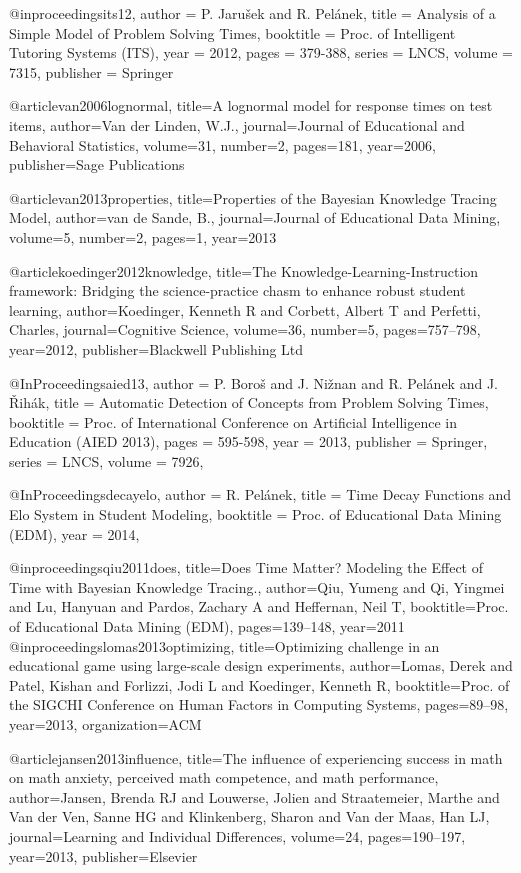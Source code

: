 @inproceedings{its12,
  author    = {P. Jaru\v{s}ek and R. Pel\'anek},
  title     = {Analysis of a Simple Model of Problem Solving Times},
  booktitle = {Proc. of Intelligent Tutoring Systems (ITS)},
  year      = {2012},
  pages     = {379-388},
  series    = {LNCS},
  volume    = {7315},
  publisher = {Springer}
}

@article{van2006lognormal,
  title={A lognormal model for response times on test items},
  author={Van der Linden, W.J.},
  journal={Journal of Educational and Behavioral Statistics},
  volume={31},
  number={2},
  pages={181},
  year={2006},
  publisher={Sage Publications}
}

@article{van2013properties,
  title={Properties of the Bayesian Knowledge Tracing Model},
  author={van de Sande, B.},
  journal={Journal of Educational Data Mining},
  volume={5},
  number={2},
  pages={1},
  year={2013}
}

@article{koedinger2012knowledge,
  title={The Knowledge-Learning-Instruction framework: Bridging the science-practice chasm to enhance robust student learning},
  author={Koedinger, Kenneth R and Corbett, Albert T and Perfetti, Charles},
  journal={Cognitive Science},
  volume={36},
  number={5},
  pages={757--798},
  year={2012},
  publisher={Blackwell Publishing Ltd}
}

@InProceedings{aied13,
  author = 	 {P. Boro\v{s} and J. Ni\v{z}nan and R. Pel\'anek and J. \v{R}ih\'ak},
  title = 	 {Automatic Detection of Concepts from Problem Solving Times},
  booktitle = {Proc. of International Conference on Artificial Intelligence in Education (AIED 2013)},
  pages     = {595-598},
  year = 	 {2013},
  publisher = {Springer},
  series    = {LNCS},
  volume    = {7926},
}

@InProceedings{decayelo,
  author = 	 {R. Pel\'anek},
  title = 	 {Time Decay Functions and Elo System in Student Modeling},
  booktitle =    {Proc. of Educational Data Mining (EDM)},
  year = 	 {2014},
}

@inproceedings{qiu2011does,
  title={Does Time Matter? Modeling the Effect of Time with Bayesian Knowledge Tracing.},
  author={Qiu, Yumeng and Qi, Yingmei and Lu, Hanyuan and Pardos, Zachary A and Heffernan, Neil T},
  booktitle={Proc. of Educational Data Mining (EDM)},
  pages={139--148},
  year={2011}
}
@inproceedings{lomas2013optimizing,
  title={Optimizing challenge in an educational game using large-scale design experiments},
  author={Lomas, Derek and Patel, Kishan and Forlizzi, Jodi L and Koedinger, Kenneth R},
  booktitle={Proc. of the SIGCHI Conference on Human Factors in Computing Systems},
  pages={89--98},
  year={2013},
  organization={ACM}
}

@article{jansen2013influence,
  title={The influence of experiencing success in math on math anxiety, perceived math competence, and math performance},
  author={Jansen, Brenda RJ and Louwerse, Jolien and Straatemeier, Marthe and Van der Ven, Sanne HG and Klinkenberg, Sharon and Van der Maas, Han LJ},
  journal={Learning and Individual Differences},
  volume={24},
  pages={190--197},
  year={2013},
  publisher={Elsevier}
}
